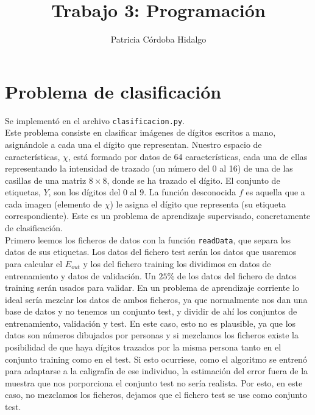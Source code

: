 \documentclass{article}
\begin{document}
\title{Trabajo 3: Programación}
\author{Patricia Córdoba Hidalgo}
\date{}
\maketitle

\tableofcontents

\section{Problema de clasificación}

Se implementó en el archivo \texttt{clasificacion.py}.\\

Este problema consiste en clasificar imágenes de dígitos escritos a mano, asignándole a cada una el dígito que representan. Nuestro espacio de características, $\chi$, está formado por datos de 64 características, cada una de ellas representando la intensidad de trazado (un número del 0 al 16) de una de las casillas de una matriz $8 \times 8$, donde se ha trazado el dígito. El conjunto de etiquetas, $Y$, son los dígitos del $0$ al $9$. La función desconocida $f$ es aquella que a cada imagen (elemento de $\chi$) le asigna el dígito que representa (su etiqueta correspondiente). Este es un problema de aprendizaje supervisado, concretamente de clasificación.\\

Primero leemos los ficheros de datos con la función \texttt{readData}, que separa los datos de sus etiquetas. Los datos del fichero test serán los datos que usaremos para calcular el $E_{out}$ y los del fichero training los dividimos en datos de entrenamiento y datos de validación. Un $25\%$ de los datos del fichero de datos training serán usados para validar. En un problema de aprendizaje corriente lo ideal sería mezclar los datos de ambos ficheros, ya que normalmente nos dan una base de datos y no tenemos un conjunto test, y dividir de ahí los conjuntos de entrenamiento, validación y test. En este caso, esto no es plausible, ya que los datos son números dibujados por personas y si mezclamos los ficheros existe la posibilidad de que haya dígitos trazados por la misma persona tanto en el conjunto training como en el test. Si esto ocurriese, como el algoritmo se entrenó para adaptarse a la caligrafía de ese individuo, la estimación del error fuera de la muestra que nos porporciona el conjunto test no sería realista. Por esto, en este caso, no mezclamos los ficheros, dejamos que el fichero test se use como conjunto test.\\
\end{document}
